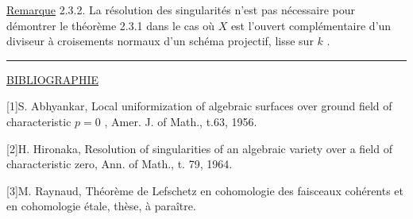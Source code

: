
\underline{Remarque} 2.3.2.  La résolution des singularités n'est pas nécessaire pour démontrer le théorème 2.3.1 dans le cas où  $X$  est l'ouvert complémentaire d'un diviseur à croisements normaux d'un schéma projectif, lisse sur  $k$ .

\begin{center}\rule{1.5cm}{0.4pt}\end{center}

\underline{BIBLIOGRAPHIE}

[1]\quad S. Abhyankar, Local uniformization of algebraic surfaces over ground field of characteristic  $p = 0$ , Amer. J. of Math., t.63, 1956.

[2]\quad H. Hironaka, Resolution of singularities of an algebraic variety over a field of characteristic zero, Ann. of Math., t. 79, 1964.

[3]\quad M. Raynaud, Théorème de Lefschetz en cohomologie des faisceaux cohérents et en cohomologie étale, thèse, à paraître.
